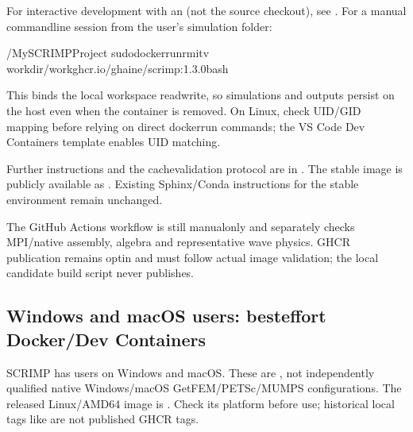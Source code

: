 \documentclass[letterpaper,10pt,english]{sphinxmanual}
\begin{document}
\sphinxAtStartPar
For interactive development with an  (not the source checkout), see {\hyperref[\detokenize{vscode::doc}]{}}.
For a manual command\sphinxhyphen{}line session from the user’s simulation folder:

\begin{sphinxVerbatim}[commandchars=\\\{\}]
\PYGZti{}/MySCRIMPProject
sudodockerrun\PYGZhy{}\PYGZhy{}rm\PYGZhy{}it\PYGZhy{}v
\PYGZhy{}\PYGZhy{}workdir/workghcr.io/g\PYGZhy{}haine/scrimp:1.3.0bash
\end{sphinxVerbatim}

\sphinxAtStartPar
This binds the local workspace read\sphinxhyphen{}write, so simulations and outputs
persist on the host even when the container is removed. On Linux,
check UID/GID mapping before relying on direct docker\sphinxhyphen{}run commands;
the VS Code Dev Containers template enables UID matching.

\sphinxAtStartPar
Further instructions and the cache\sphinxhyphen{}validation protocol are in
. The stable image is publicly available as .
Existing Sphinx/Conda instructions for the stable 
environment remain unchanged.

\sphinxAtStartPar
The GitHub Actions workflow 
is still manual\sphinxhyphen{}only and separately checks MPI/native assembly,
algebra and representative wave physics. GHCR publication remains
opt\sphinxhyphen{}in and must follow actual image validation; the local candidate
build script never publishes.


\subsection{Windows and macOS users: best\sphinxhyphen{}effort Docker/Dev Containers}
\label{\detokenize{install:windows-and-macos-users-best-effort-docker-dev-containers}}
\sphinxAtStartPar
SCRIMP has users on Windows and macOS. These are , not independently qualified native
Windows/macOS GetFEM/PETSc/MUMPS configurations. The released
Linux/AMD64 image is .
Check its platform before use; historical local tags like
 are not published GHCR tags.
\end{document}
